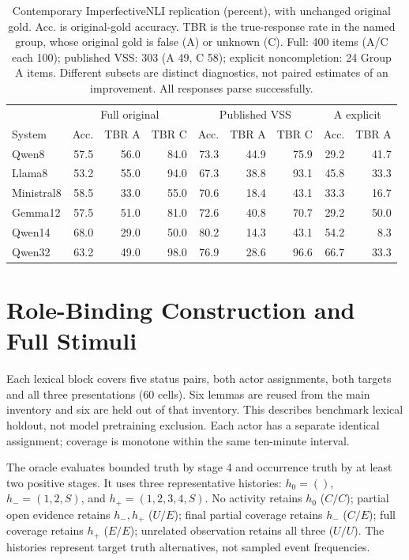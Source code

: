 \documentclass[acmlarge,anonymous,review,nonacm]{acmart}
\begin{document}
\begin{table}[H]
\centering\small
\caption{Contemporary ImperfectiveNLI replication (percent), with unchanged original gold. Acc. is original-gold accuracy. TBR is the true-response rate in the named group, whose original gold is false (A) or unknown (C). Full: 400 items (A/C each 100); published VSS: 303 (A 49, C 58); explicit noncompletion: 24 Group A items. Different subsets are distinct diagnostics, not paired estimates of an improvement. All responses parse successfully.}
\label{tab:replication_results}
\setlength{\tabcolsep}{5pt}
\begin{tabular}{lrrrrrrrr}
\toprule
 & \multicolumn{3}{c}{Full original} & \multicolumn{3}{c}{Published VSS} & \multicolumn{2}{c}{A explicit}\\
System & Acc. & TBR A & TBR C & Acc. & TBR A & TBR C & Acc. & TBR A\\
\midrule
Qwen8 & 57.5 & 56.0 & 84.0 & 73.3 & 44.9 & 75.9 & 29.2 & 41.7 \\
Llama8 & 53.2 & 55.0 & 94.0 & 67.3 & 38.8 & 93.1 & 45.8 & 33.3 \\
Ministral8 & 58.5 & 33.0 & 55.0 & 70.6 & 18.4 & 43.1 & 33.3 & 16.7 \\
Gemma12 & 57.5 & 51.0 & 81.0 & 72.6 & 40.8 & 70.7 & 29.2 & 50.0 \\
Qwen14 & 68.0 & 29.0 & 50.0 & 80.2 & 14.3 & 43.1 & 54.2 & 8.3 \\
Qwen32 & 63.2 & 49.0 & 98.0 & 76.9 & 28.6 & 96.6 & 66.7 & 33.3 \\
\bottomrule
\end{tabular}
\end{table}

\section{Role-Binding Construction and Full Stimuli}
Each lexical block covers five status pairs, both actor assignments, both targets and all three presentations (60 cells). Six lemmas are reused from the main inventory and six are held out of that inventory. This describes benchmark lexical holdout, not model pretraining exclusion. Each actor has a separate identical assignment; coverage is monotone within the same ten-minute interval.

The oracle evaluates bounded truth by stage 4 and occurrence truth by at least two positive stages. It uses three representative histories: $h_0=()$, $h_-=(1,2,S)$, and $h_+=(1,2,3,4,S)$. No activity retains $h_0$ ($C/C$); partial open evidence retains $h_-,h_+$ ($U/E$); final partial coverage retains $h_-$ ($C/E$); full coverage retains $h_+$ ($E/E$); unrelated observation retains all three ($U/U$). The histories represent target truth alternatives, not sampled event frequencies.
\end{document}
